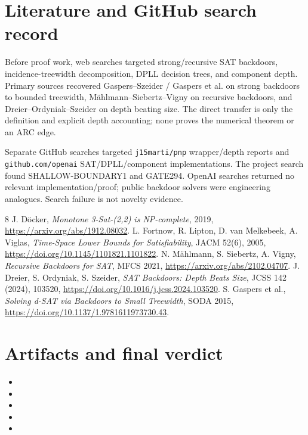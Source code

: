 \documentclass[11pt]{article}
\begin{document}
\section{Literature and GitHub search record}
Before proof work, web searches targeted strong/recursive SAT backdoors, incidence-treewidth decomposition, DPLL decision trees, and component depth.  Primary sources recovered Gaspers--Szeider / Gaspers et al. on strong backdoors to bounded treewidth, M\"ahlmann--Siebertz--Vigny on recursive backdoors, and Dreier--Ordyniak--Szeider on depth beating size.  The direct transfer is only the definition and explicit depth accounting; none proves the numerical theorem or an ARC edge.

Separate GitHub searches targeted \texttt{j15marti/pnp} wrapper/depth reports and \texttt{github.com/openai} SAT/DPLL/component implementations.  The project search found SHALLOW-BOUNDARY1 and GATE294.  OpenAI searches returned no relevant implementation/proof; public backdoor solvers were engineering analogues.  Search failure is not novelty evidence.

\begin{thebibliography}{8}
 J. D\"ocker, \emph{Monotone 3-Sat-(2,2) is NP-complete}, 2019, \url{https://arxiv.org/abs/1912.08032}.
 L. Fortnow, R. Lipton, D. van Melkebeek, A. Viglas, \emph{Time-Space Lower Bounds for Satisfiability}, JACM 52(6), 2005, \url{https://doi.org/10.1145/1101821.1101822}.
 N. M\"ahlmann, S. Siebertz, A. Vigny, \emph{Recursive Backdoors for SAT}, MFCS 2021, \url{https://arxiv.org/abs/2102.04707}.
 J. Dreier, S. Ordyniak, S. Szeider, \emph{SAT Backdoors: Depth Beats Size}, JCSS 142 (2024), 103520, \url{https://doi.org/10.1016/j.jcss.2024.103520}.
 S. Gaspers et al., \emph{Solving d-SAT via Backdoors to Small Treewidth}, SODA 2015, \url{https://doi.org/10.1137/1.9781611973730.43}.
\end{thebibliography}

\section{Artifacts and final verdict}
\begin{itemize}
\item {}
\item {}
\item {}
\item {}
\item {}
\end{itemize}
\end{document}
